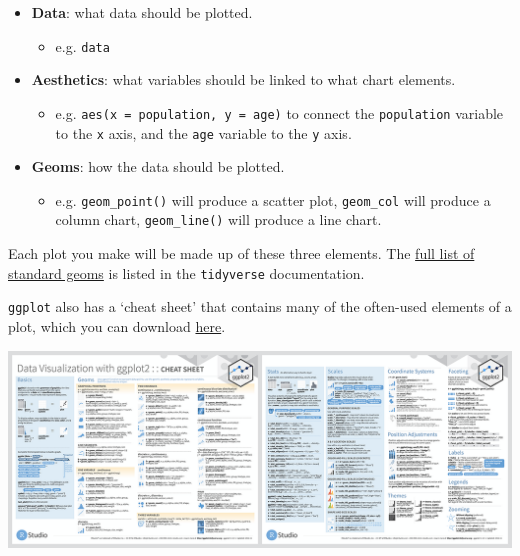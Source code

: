 \documentclass[]{book}
\providecommand{\tightlist}{%
  \setlength{\itemsep}{0pt}\setlength{\parskip}{0pt}}
\begin{document}
\begin{itemize}
\tightlist
\item
  \textbf{Data}: what data should be plotted.

  \begin{itemize}
  \tightlist
  \item
    e.g. \texttt{data}
  \end{itemize}
\item
  \textbf{Aesthetics}: what variables should be linked to what chart elements.

  \begin{itemize}
  \tightlist
  \item
    e.g. \texttt{aes(x\ =\ population,\ y\ =\ age)} to connect the \texttt{population} variable to the \texttt{x} axis, and the \texttt{age} variable to the \texttt{y} axis.
  \end{itemize}
\item
  \textbf{Geoms}: how the data should be plotted.

  \begin{itemize}
  \tightlist
  \item
    e.g. \texttt{geom\_point()} will produce a scatter plot, \texttt{geom\_col} will produce a column chart, \texttt{geom\_line()} will produce a line chart.
  \end{itemize}
\end{itemize}

Each plot you make will be made up of these three elements. The \href{https://ggplot2.tidyverse.org/reference/}{full list of standard geoms} is listed in the \texttt{tidyverse} documentation.

\texttt{ggplot} also has a `cheat sheet' that contains many of the often-used elements of a plot, which you can download \href{https://github.com/rstudio/cheatsheets/raw/master/data-visualization-2.1.pdf}{here}.

\begin{center}\includegraphics[width=17.08in]{atlas/ggplot_cheat_sheet} \end{center}
\end{document}
